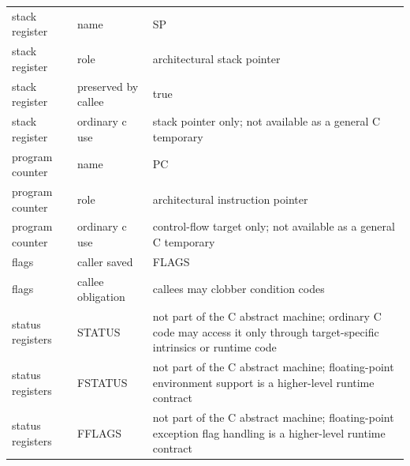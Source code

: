 \documentclass[10pt,twoside]{article}
\begin{document}
\begin{longtable}{@{}p{1.35in}p{1.55in}p{2.6in}@{}}
stack register & name & SP\\
stack register & role & architectural stack pointer\\
stack register & preserved by callee & true\\
stack register & ordinary c use & stack pointer only; not available as a general C temporary\\
program counter & name & PC\\
program counter & role & architectural instruction pointer\\
program counter & ordinary c use & control-flow target only; not available as a general C temporary\\
flags & caller saved & FLAGS\\
flags & callee obligation & callees may clobber condition codes\\
status registers & STATUS & not part of the C abstract machine; ordinary C code may access it only through target-specific intrinsics or runtime code\\
status registers & FSTATUS & not part of the C abstract machine; floating-point environment support is a higher-level runtime contract\\
status registers & FFLAGS & not part of the C abstract machine; floating-point exception flag handling is a higher-level runtime contract\\
\bottomrule
\end{longtable}
\endgroup
\end{document}
